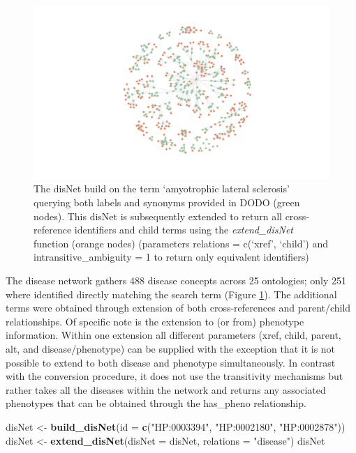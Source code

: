 \documentclass[9pt,a4paper,]{extarticle}
\newenvironment{Shaded}{\begin{snugshade}}{\end{snugshade}}
\newcommand{\DataTypeTok}[1]{\textcolor[rgb]{0.13,0.29,0.53}{#1}}
\newcommand{\KeywordTok}[1]{\textcolor[rgb]{0.13,0.29,0.53}{\textbf{#1}}}
\newcommand{\NormalTok}[1]{#1}
\newcommand{\StringTok}[1]{\textcolor[rgb]{0.31,0.60,0.02}{#1}}
\begin{document}
\begin{figure}

{\centering \includegraphics[width=1.1\linewidth]{DODO-F1000-publication_files/figure-latex/alsplotdisNet-1} 

}

\caption{The disNet build on the term `amyotrophic lateral sclerosis' querying both labels and synonyms provided in DODO (green nodes). This disNet is subsequently extended to return all cross-reference identifiers and child terms using the \emph{extend\_disNet} function (orange nodes) (parameters relations = c(`xref', `child') and intransitive\_ambiguity = 1 to return only equivalent identifiers)}\label{fig:alsplotdisNet}
\end{figure}

The disease network gathers 488 disease concepts across 25 ontologies; only 251 where identified directly matching the search term (Figure \ref{fig:alsplotdisNet}). The additional terms were obtained through extension of both cross-references and parent/child relationships.
Of specific note is the extension to (or from) phenotype information. Within one extension all different parameters (xref, child, parent, alt, and disease/phenotype) can be supplied with the exception that it is not possible to extend to both disease and phenotype simultaneously. In contrast with the conversion procedure, it does not use the transitivity mechanisms but rather takes all the diseases within the network and returns any associated phenotypes that can be obtained through the has\_pheno relationship.

\begin{Shaded}
\begin{Highlighting}[]
\NormalTok{disNet <-}\StringTok{ }\KeywordTok{build_disNet}\NormalTok{(}\DataTypeTok{id =} \KeywordTok{c}\NormalTok{(}\StringTok{"HP:0003394"}\NormalTok{, }\StringTok{"HP:0002180"}\NormalTok{, }\StringTok{"HP:0002878"}\NormalTok{))}
\NormalTok{disNet <-}\StringTok{ }\KeywordTok{extend_disNet}\NormalTok{(}\DataTypeTok{disNet =}\NormalTok{ disNet, }\DataTypeTok{relations =} \StringTok{"disease"}\NormalTok{)}
\NormalTok{disNet}
\end{Highlighting}
\end{Shaded}
\end{document}
